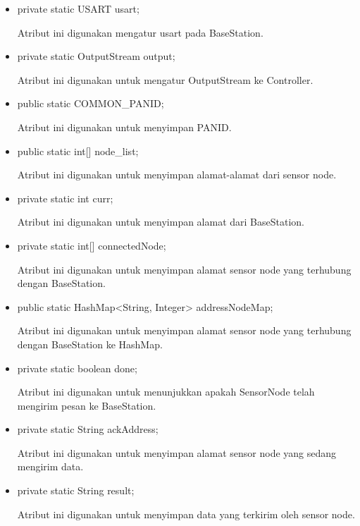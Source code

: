 \begin{itemize}
    \item private static USART usart;
    
    Atribut ini digunakan mengatur usart pada BaseStation.
    
    \item private static OutputStream output;
    
    Atribut ini digunakan untuk mengatur OutputStream ke Controller.
    
    \item public static COMMON\_PANID;
    
    Atribut ini digunakan untuk menyimpan PANID.
    
    \item public static int[] node\_list;
    
    Atribut ini digunakan untuk menyimpan alamat-alamat dari sensor node.
    
    \item private static int curr;
    
    Atribut ini digunakan untuk menyimpan alamat dari BaseStation.
    
    \item private static int[] connectedNode;
    
    Atribut ini digunakan untuk menyimpan alamat sensor node yang terhubung dengan BaseStation.
    
    \item public static HashMap<String, Integer> addressNodeMap;
    
    Atribut ini digunakan untuk menyimpan alamat sensor node yang terhubung dengan BaseStation ke HashMap.
    
    \item private static boolean done;
    
    Atribut ini digunakan untuk menunjukkan apakah SensorNode telah mengirim pesan ke BaseStation.
    
    \item private static String ackAddress;
    
    Atribut ini digunakan untuk menyimpan alamat sensor node yang sedang mengirim data.
    
    \item private static String result;
    
    Atribut ini digunakan untuk menyimpan data yang terkirim oleh sensor node.
    
\end{itemize}

